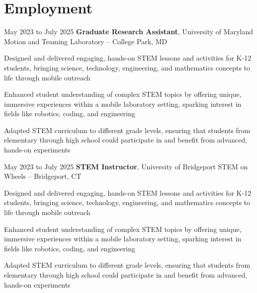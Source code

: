 \section{Employment}
    \begin{twocolentry}{
        May 2023 to July 2025
    }
        \textbf{Graduate Research Assistant}, University of Maryland Motion and Teaming Laboratory -- College Park, MD\end{twocolentry}

    \vspace{0.10 cm}
    \begin{onecolentry}
        \begin{highlights}
          \item Designed and delivered engaging, hands-on STEM lessons and activities for K-12 students, bringing science, technology, engineering, and mathematics concepts to life through mobile outreach
          \item Enhanced student understanding of complex STEM topics by offering unique, immersive experiences within a mobile laboratory setting, sparking interest in fields like robotics, coding, and engineering
          \item Adapted STEM curriculum to different grade levels, ensuring that students from elementary through high school could participate in and benefit from advanced, hands-on experiments
        \end{highlights}
    \end{onecolentry}  
    
    \vspace{0.2 cm}

    \begin{twocolentry}{
        May 2023 to July 2025
    }
        \textbf{STEM Instructor}, University of Bridgeport STEM on Wheels -- Bridgeport, CT\end{twocolentry}

    \vspace{0.10 cm}
    \begin{onecolentry}
        \begin{highlights}
          \item Designed and delivered engaging, hands-on STEM lessons and activities for K-12 students, bringing science, technology, engineering, and mathematics concepts to life through mobile outreach
          \item Enhanced student understanding of complex STEM topics by offering unique, immersive experiences within a mobile laboratory setting, sparking interest in fields like robotics, coding, and engineering
          \item Adapted STEM curriculum to different grade levels, ensuring that students from elementary through high school could participate in and benefit from advanced, hands-on experiments
        \end{highlights}
    \end{onecolentry}  
    
